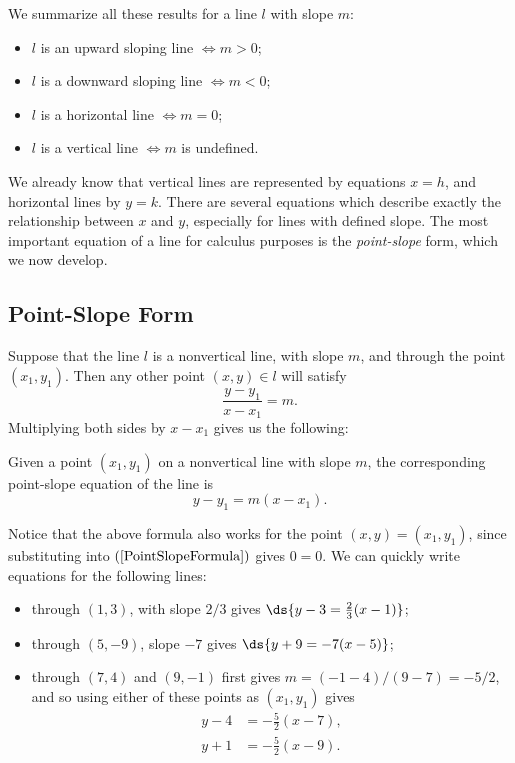 We summarize all these results for a line $l$ with slope $m$:
\begin{itemize}
 \item $l$ is an upward sloping line $\iff  m>0$;
 \item $l$ is a downward sloping line $\iff m<0$;
 \item $l$ is a horizontal line $\iff m=0$;
 \item $l$ is a vertical line $\iff m$ is undefined. 
\end{itemize}

We already know that vertical lines are represented by
equations $x=h$, and horizontal lines by $y=k$.  
There are several equations which describe exactly
the relationship between $x$ and $y$, especially for
lines with defined slope.  The most important equation
of a line for calculus purposes is the {\it point-slope}
form, which we now develop.

\subsection{Point-Slope Form}
Suppose that the line $l$ is a nonvertical line, with
slope $m$, and through the point $(x_1,y_1)$.  Then any
other point $(x,y)\in l$ will satisfy
$$\frac{y-y_1}{x-x_1}=m.$$
Multiplying both sides by $x-x_1$ gives us the following:
\begin{definition}Given a point $(x_1,y_1)$ on a nonvertical line
with slope $m$, the corresponding {\rm point-slope}
equation of the line is
\begin{equation}
y-y_1=m(x-x_1).
\label{PointSlopeFormula}
\end{equation}\end{definition}
Notice that the above formula also works for the point $(x,y)=(x_1,y_1)$,
since substituting into $(\ref{PointSlopeFormula})$ gives $0=0$.
\bex  We can quickly write equations for the following lines:
\begin{itemize}
\item through $(1,3)$, with slope $2/3$ gives
$\ds{y-3=\frac23(x-1)}$;
\item through $(5,-9)$, slope $-7$ gives $\ds{y+9=-7(x-5)}$;
\item through $(7,4)$ and $(9,-1)$ first gives
      $m=(-1-4)/(9-7)=-5/2$, and so using either of these points as
      $(x_1,y_1)$ gives
      \begin{align*}
           y-4&=-\frac52(x-7),\\
           y+1&=-\frac52(x-9).
      \end{align*}
\end{itemize}
\eex

